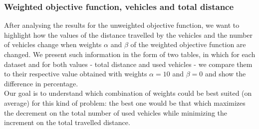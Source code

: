 \subsubsection{Weighted objective function, vehicles and total distance}
After analysing the results for the unweighted objective function, we want to highlight how the values of the distance travelled by the vehicles and the number of vehicles change when weights $\alpha$ and $\beta$ of the weighted objective function are changed.
We present such information in the form of two tables, in which for each dataset and for both values - total distance and used vehicles - we compare them to their respective value obtained with weights $\alpha=10$ and $\beta=0$ and show the difference in percentage.\\
Our goal is to understand which combination of weights could be best suited (on average) for this kind of problem: the best one would be that which maximizes the decrement on the total number of used vehicles while minimizing the increment on the total travelled distance.
